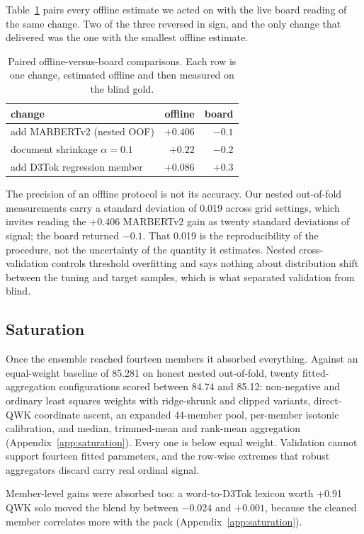 \documentclass[11pt]{article}
\begin{document}
Table~\ref{tab:paired} pairs every offline estimate we acted on with the live board reading of
the same change. Two of the three reversed in sign, and the only change that delivered was the
one with the smallest offline estimate.

\begin{table}[t]
\centering\small
\begin{tabular}{@{}lrr@{}}
\toprule
change & offline & board \\
\midrule
add MARBERTv2 (nested OOF) & $+0.406$ & $-0.1$ \\
document shrinkage $\alpha{=}0.1$ & $+0.22$ & $-0.2$ \\
add D3Tok regression member & $+0.086$ & $+0.3$ \\
\bottomrule
\end{tabular}
\caption{Paired offline-versus-board comparisons. Each row is one change, estimated offline
and then measured on the blind gold.}
\label{tab:paired}
\end{table}

The precision of an offline protocol is not its accuracy. Our nested out-of-fold measurements
carry a standard deviation of 0.019 across grid settings, which invites reading the +0.406
MARBERTv2 gain as twenty standard deviations of signal; the board returned $-0.1$. That 0.019
is the reproducibility of the procedure, not the uncertainty of the quantity it estimates.
Nested cross-validation controls threshold overfitting and says nothing about distribution
shift between the tuning and target samples, which is what separated validation from blind.

\subsection{Saturation}

Once the ensemble reached fourteen members it absorbed everything. Against an equal-weight
baseline of 85.281 on honest nested out-of-fold, twenty fitted-aggregation configurations
scored between 84.74 and 85.12: non-negative and ordinary least squares weights with
ridge-shrunk and clipped variants, direct-QWK coordinate
ascent, an expanded 44-member pool, per-member isotonic calibration, and median, trimmed-mean
and rank-mean aggregation (Appendix~\ref{app:saturation}). Every one is below equal weight.
Validation cannot support fourteen fitted parameters, and the row-wise extremes that robust
aggregators discard carry real ordinal signal.

Member-level gains were absorbed too: a word-to-D3Tok lexicon worth +0.91 QWK solo moved the
blend by between $-0.024$ and $+0.001$, because the cleaned member correlates more with the
pack (Appendix~\ref{app:saturation}).
\end{document}
